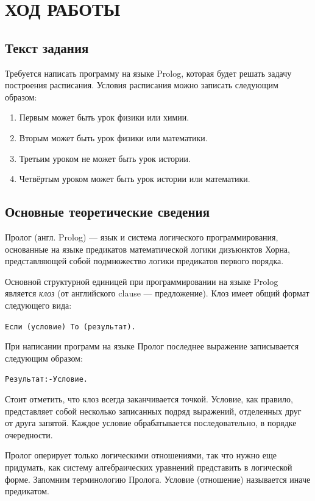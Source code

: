 \section{ХОД РАБОТЫ}

\subsection{Текст задания}

Требуется написать программу на языке Prolog, которая будет решать задачу построения расписания.
Условия расписания можно записать следующим образом:
\begin{enumerate}
  \item Первым может быть урок физики или химии.
  \item Вторым может быть урок физики или математики.
  \item Третьим уроком не может быть урок истории.
  \item Четвёртым уроком может быть урок истории или математики.
\end{enumerate}


\subsection{Основные теоретические сведения}

Пролог (англ. Prolog) --- язык и система логического программирования,
основанные на языке предикатов математической логики дизъюнктов Хорна,
представляющей собой подмножество логики предикатов первого порядка.

Основной структурной единицей при программировании на языке Prolog является \textit{клоз}
(от английского clause --- предложение). Клоз имеет общий формат следующего вида:

\texttt{Если (условие) То (результат).}

При написании программ на языке Пролог последнее выражение записывается следующим образом:

\texttt{Результат:-Условие.}

Стоит отметить, что клоз всегда заканчивается точкой.
Условие, как правило, представляет собой несколько
записанных подряд выражений, отделенных друг от друга запятой.
Каждое условие обрабатывается последовательно, в порядке очередности.

Пролог оперирует только логическими отношениями, так что нужно еще придумать,
как систему алгебраических уравнений представить в логической форме.
Запомним терминологию Пролога. Условие (отношение) называется иначе предикатом.

